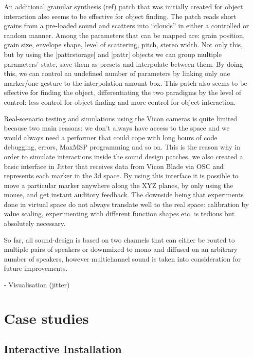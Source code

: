 \documentclass{nime-alternate}
\begin{document}
An additional granular synthesis (ref) patch that was initially created for object interaction also seems to be effective for object finding. The patch reads short grains from a pre-loaded sound and scatters into “clouds” in either a controlled or random manner. Among the parameters that can be mapped are: grain position, grain size, envelope shape, level of scattering, pitch, stereo width. Not only this, but by using the [pattrstorage] and [pattr] objects we can group multiple parameters’ state, save them as presets and interpolate between them. By doing this, we can control an undefined number of parameters by linking only one marker/one gesture to the interpolation amount box. This patch also seems to be effective for finding the object, differentiating the two paradigms by the level of control: less control for object finding and more control for object interaction.

Real-scenario testing and simulations using the Vicon cameras is quite limited because two main reasons: we don’t always have access to the space and we would always need a performer that could cope with long hours of code debugging, errors, MaxMSP programming and so on. This is the reason why in order to simulate interactions inside the sound design patches, we also created a basic interface in Jitter that receives data from Vicon Blade via OSC and represents each marker in the 3d space. By using this interface it is possible to move a particular marker anywhere along the XYZ planes, by only using the mouse, and get instant auditory feedback. The downside being that experiments done in virtual space do not always translate well to the real space: calibration by value scaling, experimenting with different function shapes etc. is tedious but absolutely necessary.

So far, all sound-design is based on two channels that can either be routed to multiple pairs of speakers or downmixed to mono and diffused on an arbitrary number of speakers, however multichannel sound is taken into consideration for future improvements.


- Visualisation (jitter)

\section{Case studies}



\subsection{Interactive Installation}
\end{document}
